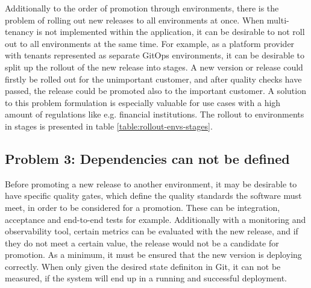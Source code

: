Additionally to the order of promotion through environments,
there is the problem of rolling out new releases to all environments at once.
When
multi-tenancy is not implemented within the application,
it can be desirable to not roll out to all environments at the same time.
For example, as a platform provider with tenants represented as separate GitOps
environments, it can be desirable to split up the rollout of the new release into stages.
A new version or release could firstly be rolled out for the unimportant customer,
and after quality checks have passed,
the release could be promoted also to the important customer.
A solution to this problem formulation is especially valuable for
use cases with a high amount of regulations like e.g. financial institutions.
The rollout to environments in stages is presented in table \ref{table:rollout-envs-stages}.





\subsection{Problem 3: Dependencies can not be defined}
\label{problem3}

Before promoting a new release to another environment,
it may be desirable to have specific
quality gates, which define the quality standards the
software must meet, in order to be considered for a promotion.
These can be integration, acceptance and end-to-end tests for example.
Additionally with a monitoring and observability tool,
certain metrics can be evaluated with the new release,
and if they do not meet a certain value, the release would not
be a candidate for promotion.
As a minimum, it must be ensured that the new version is 
deploying correctly. When only given the desired state definiton
in Git, it can not be measured, if the system will end up in a running
and successful deployment.


